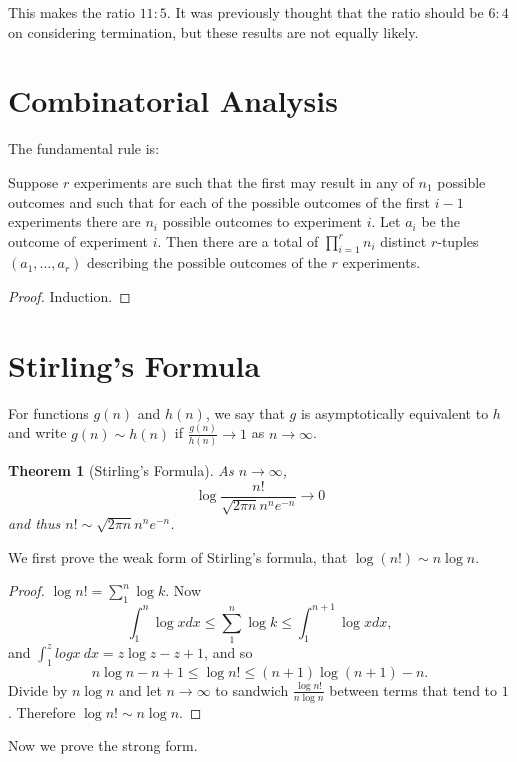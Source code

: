 \documentclass{notes}
\theoremstyle{plain}
\newtheorem{theorem}{Theorem}[chapter]
\begin{document}
This makes the ratio $11:5$.  It was previously thought that the ratio should
be $6:4$ on considering termination, but these results are not equally likely.

\section{Combinatorial Analysis}

The fundamental rule is:

Suppose $r$ experiments are such that the first may result in any of $n_1$
possible outcomes and such that for each of the possible outcomes of the
first $i-1$ experiments there are $n_i$ possible outcomes to experiment $i$.
Let $a_i$ be the outcome of experiment $i$.  Then there are a total
of $\prod_{i=1}^r n_i$ distinct $r$-tuples $( a_1, \dots, a_r)$ describing
the possible outcomes of the $r$ experiments.

\begin{proof}
Induction.
\end{proof}

\section{Stirling's Formula}

For functions $g(n)$ and $h(n)$, we say that $g$ is asymptotically equivalent
to $h$ and write $g(n) \sim h(n)$ if $\tfrac{g(n)}{h(n)} \rightarrow 1$ as
$n \rightarrow \infty$.

\begin{theorem}[Stirling's Formula]
As $n \rightarrow \infty$, 
\[
\log \frac{n!}{\sqrt{2 \pi n} n^n e^{-n}} \rightarrow 0
\]
and thus $n! \sim \sqrt{2 \pi n} n^n e^{-n}$.
\end{theorem}

We first prove the weak form of Stirling's formula, that $\log(n!) \sim n \log n$.

\begin{proof}
$\log n! = \sum_{1}^n \log k$.  Now
\[
\int_1^n \log x dx \le \sum_{1}^n \log k \le \int_1^{n+1} \log x dx,
\]
and $\int_1^z log x\ dx = z \log z - z + 1$, and so
\[
n \log n - n + 1 \le \log n! \le (n+1) \log (n+1) - n.
\]
Divide by $n \log n$ and let $n \rightarrow \infty$ to sandwich
$\tfrac{\log n!}{n \log n}$ between terms that tend to $1$.  Therefore
$\log n! \sim n \log n$.
\end{proof}

Now we prove the strong form.
\end{document}
